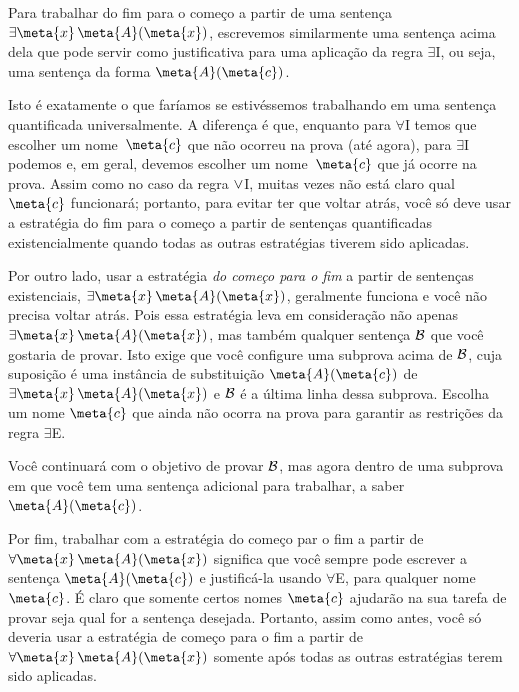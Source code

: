 Para trabalhar do fim para o começo  a partir de uma sentença $\exists \meta{x}\, \atom{\meta{A}}{\meta{x}}$, escrevemos similarmente uma sentença acima dela que pode servir como justificativa para uma aplicação da regra $\exists$I, ou seja, uma sentença da forma $\atom{\meta{A}}{\meta{c}}$. 
\begin{fitchproof}
	\ellipsesline
\end{fitchproof}
Isto é exatamente o que faríamos se estivéssemos trabalhando em uma sentença quantificada universalmente. A diferença é que, enquanto para $\forall$I temos que escolher um nome~$\meta{c}$ que não ocorreu na prova (até agora), para $\exists$I podemos e, em geral, devemos escolher um nome~$\meta{c}$ que já ocorre na prova. Assim como no caso da regra $\vee$I, muitas vezes não está claro qual $\meta{c}$ funcionará; portanto, para evitar ter que voltar atrás, você só deve usar a estratégia do fim para o começo a partir de sentenças quantificadas existencialmente quando todas as outras estratégias tiverem sido aplicadas.

Por outro lado, usar a estratégia \emph{do começo para o fim} a partir de sentenças existenciais,  $\exists \meta{x}\, \atom{\meta{A}}{\meta{x}}$, geralmente funciona e você não precisa voltar atrás. Pois essa estratégia leva em consideração não apenas
 $\exists \meta{x}\, \atom{\meta{A}}{\meta{x}}$, mas também qualquer sentença $\mathcal{B}$ que você gostaria de provar. Isto exige que você configure uma subprova acima de $\mathcal{B}$, cuja suposição é uma instância de substituição $\atom{\meta{A}}{\meta{c}}$ de $\exists \meta{x}\, \atom{\meta{A}}{\meta{x}}$ e $\mathcal{B}$  é a última linha dessa subprova. Escolha um nome $\meta{c}$ que ainda não ocorra na prova para garantir as restrições da regra $\exists$E.
 
\begin{fitchproof}
	\ellipsesline
	\ellipsesline
	\open
	\ellipsesline
	\close
\end{fitchproof}
Você continuará com o objetivo de provar $\mathcal{B}$, mas agora dentro de uma subprova em que você tem uma sentença adicional para trabalhar, a saber~$\atom{\meta{A}}{\meta{c}}$.

Por fim, trabalhar com a estratégia do começo par o fim a partir de $\forall \meta{x}\, \atom{\meta{A}}{\meta{x}}$ significa que você sempre pode escrever a sentença $\atom{\meta{A}}{\meta{c}}$ e justificá-la usando $\forall$E, para qualquer nome~$\meta{c}$.  É claro que somente certos nomes $\meta{c}$ ajudarão na sua tarefa de provar seja qual for a sentença desejada. Portanto, assim como antes, você só deveria  usar a estratégia de começo para o fim a partir de  $\forall \meta{x}\, \atom{\meta{A}}{\meta{x}}$ somente após todas as outras estratégias terem sido aplicadas.

